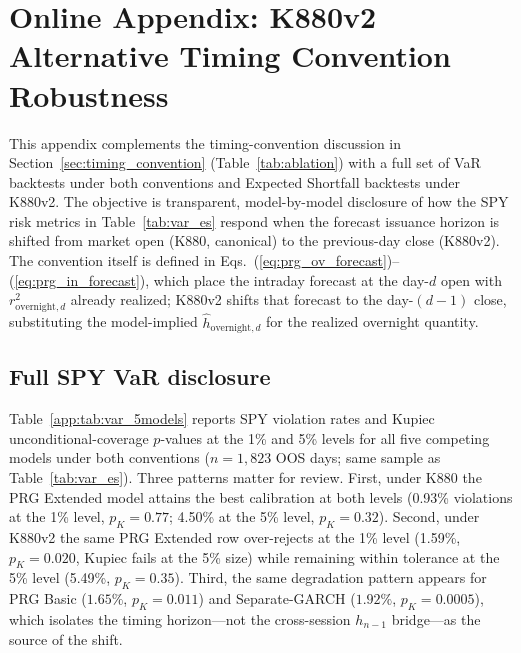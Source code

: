 \documentclass[11pt,a4paper]{article}
\begin{document}
\appendix
\section{Online Appendix: K880v2 Alternative Timing Convention Robustness}
\label{app:k880v2_robustness}

This appendix complements the timing-convention discussion in
Section~\ref{sec:timing_convention} (Table~\ref{tab:ablation}) with a
full set of VaR backtests under both conventions and Expected Shortfall
backtests under K880v2. The objective is transparent, model-by-model
disclosure of how the SPY risk metrics in Table~\ref{tab:var_es} respond
when the forecast issuance horizon is shifted from market open (K880,
canonical) to the previous-day close (K880v2). The convention itself is
defined in Eqs.~(\ref{eq:prg_ov_forecast})--(\ref{eq:prg_in_forecast}),
which place the intraday forecast at the day-$d$ open with
$r^2_{\text{overnight},d}$ already realized; K880v2 shifts that
forecast to the day-$(d{-}1)$ close, substituting the model-implied
$\hat h_{\text{overnight},d}$ for the realized overnight quantity.

\subsection*{Full SPY VaR disclosure}

Table~\ref{app:tab:var_5models} reports SPY violation rates and Kupiec
unconditional-coverage $p$-values at the 1\% and 5\% levels for all five
competing models under both conventions ($n = 1{,}823$ OOS days; same
sample as Table~\ref{tab:var_es}). Three patterns matter for review.
First, under K880 the PRG Extended model attains the best calibration at
both levels (0.93\% violations at the 1\% level, $p_{K} = 0.77$;
4.50\% at the 5\% level, $p_{K} = 0.32$). Second, under K880v2 the same
PRG Extended row over-rejects at the 1\% level (1.59\%, $p_{K} = 0.020$,
Kupiec fails at the 5\% size) while remaining within tolerance at the
5\% level (5.49\%, $p_{K} = 0.35$). Third, the same degradation pattern
appears for PRG Basic ($1.65\%$, $p_{K} = 0.011$) and Separate-GARCH
($1.92\%$, $p_{K} = 0.0005$), which isolates the timing horizon---not
the cross-session $h_{n-1}$ bridge---as the source of the shift.
\end{document}
